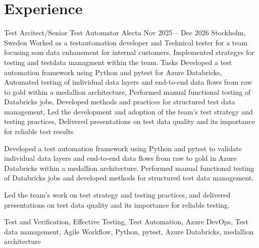 \documentclass{sobCV}[2015/09/08]
\begin{document}
\section{Experience}

\experiencenode
{Test Arcitect/Senior Test Automator}
{Alecta}
{Nov 2025 -- Dec 2026}
{Stockholm, Sweden}{
   Worked as a testautomation developer and Technical tester for a team
   focusing som data enhansment for internal customers. Implemented strategys
   for testing and testdata managment  within the team.
}
{Tasks}{
    Developed a test automation framework using Python and pytest for Azure Databricks,
    Automated testing of individual data layers and end-to-end data flows from raw to gold within a medallion architecture,
    Performed manual functional testing of Databricks jobs,
    Developed methods and practices for structured test data management,
    Led the development and adoption of the team’s test strategy and testing practices,
    Delivered presentations on test data quality and its importance for reliable test results
}{  %
	{
        Developed a test automation framework using Python and pytest to
        validate individual data layers and end-to-end data flows from raw to
        gold in Azure Databricks within a medallion architecture. Performed
        manual functional testing of Databricks jobs and developed methods for
        structured test data management.
        
        Led the team’s work on test strategy and testing practices, and
        delivered presentations on test data quality and its importance for
        reliable testing.
	}
}{
   
	Test and Verification,
	Effective Testing,
	Test Automation,
	Azure DevOps,
	Test data management,
	Agile Workflow,
    Python, 
    pytest, 
    Azure Databricks, 
    medallion architecture 
}
\end{document}
